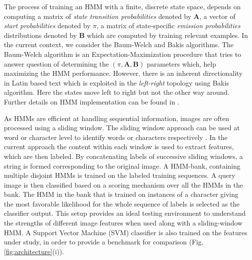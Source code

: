 \documentclass[runningheads]{llncs}
\def\A{{\mathbf A}}
\def\B{{\mathbf B}}
\begin{document}
The process of training an HMM with a finite, discrete state space, depends on computing a matrix of \emph{state transition probabilities} denoted by $\A$, a vector of \emph{start probabilities} denoted by $\pi$, a matrix of state-specific \emph{emission probabilities} distributions denoted by $\B$ which are computed by training relevant examples. In the current context, we consider the Baum-Welch and Bakis algorithms. The Baum-Welch algorithm is an Expectation-Maximization procedure that tries to answer question of determining the $(\pi, \A, \B)$ parameters which, help maximizing the HMM performance. However, there is an inherent directionality in Latin based text which is exploited in the \emph{left-right} topology using Bakis algorithm. Here the states move left to right but not the other way around. Further details on HMM implementation can be found in \cite{Rabi89}.

As HMMs are efficient at handling sequential information, images are often processed using a sliding window. The sliding window approach can be used at word or character level to identify words or characters respectively \cite{Fink09}. In the current approach the content within each window is used to extract features, which are then labeled. By concatenating labels of successive sliding windows, a string is formed corresponding to the original image. A HMM-bank, containing multiple disjoint HMMs is trained on the labeled training sequences. A query image is then classified based on a scoring mechanism over all the HMMs in the bank. The HMM in the bank that is trained on instances of a character giving the most favorable likelihood for the whole sequence of labels is selected as the classifier output. This setup provides an ideal testing environment to understand the strengths of different image features when used along with a sliding-window HMM. A Support Vector Machine (SVM) classifier is also trained on the features under study, in order to provide a benchmark for comparison (Fig. {\ref{fig:architecture}}(i)).
\end{document}
